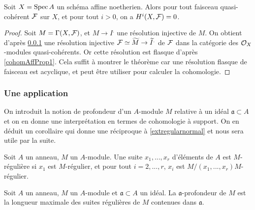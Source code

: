 \begin{thm}\label{cohomoaffine}
Soit $X=\operatorname{Spec} A$ un schéma affine noetherien. Alors pour tout faisceau quasi-cohérent $\mathcal{F}$ sur $X$, et pour tout $i>0$, on a $H^i(X,\mathcal{F})=0$. 
\end{thm}
\begin{proof}
Soit $M=\Gamma(X,\mathcal{F})$, et $M\rightarrow I^.$ une résolution injective de $M$. On obtient d'après \ref{} une résolution injective $\mathcal{F}\simeq \widetilde{M}\rightarrow \widetilde{I}^.$ de $\mathcal{F}$ dans la catégorie des $\mathcal{O}_X$-modules quasi-cohérents. Or cette résolution est flasque d'après \ref{cohomAffProp1}. Cela suffit à montrer le théorème car une résolution flasque de faisceau est acyclique, et peut être utiliser pour calculer la cohomologie.
\end{proof}

\subsubsection{Une application}

On introduit la notion de profondeur d'un $A$-module $M$ relative à un idéal $\mathfrak{a}\subset A$ et on en donne une interprétation en termes de cohomologie à support. On en déduit un corollaire qui donne une réciproque à \ref{extregularnormal} et nous sera utile par la suite.

\begin{defn}
Soit $A$ un anneau, $M$ un $A$-module. Une suite $x_1,...,x_r$ d'éléments de $A$ est $M$-régulière si $x_1$ est $M$-régulier, et pour tout $i=2,...,r$, $x_i$ est $M/(x_1,...,x_r)M$-régulier.
\end{defn}

\begin{defn}[Profondeur]
Soit $A$ un anneau, $M$ un $A$-module et $\mathfrak{a}\subset A$ un idéal. La $\mathfrak{a}$-profondeur de $M$ est la longueur maximale des suites régulières de $M$ contenues dans $\mathfrak{a}$.
\end{defn}



